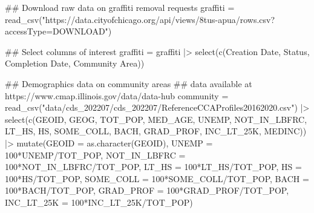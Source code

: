 \documentclass[
]{report}
\newenvironment{Shaded}{}{}
\newcommand{\AttributeTok}[1]{\textcolor[rgb]{0.84,0.23,0.29}{#1}}
\newcommand{\DecValTok}[1]{\textcolor[rgb]{0.00,0.36,0.77}{#1}}
\newcommand{\DocumentationTok}[1]{\textcolor[rgb]{0.42,0.45,0.49}{#1}}
\newcommand{\FunctionTok}[1]{\textcolor[rgb]{0.44,0.26,0.76}{#1}}
\newcommand{\NormalTok}[1]{\textcolor[rgb]{0.14,0.16,0.18}{#1}}
\newcommand{\OtherTok}[1]{\textcolor[rgb]{0.44,0.26,0.76}{#1}}
\newcommand{\SpecialCharTok}[1]{\textcolor[rgb]{0.00,0.36,0.77}{#1}}
\newcommand{\StringTok}[1]{\textcolor[rgb]{0.01,0.18,0.38}{#1}}
\begin{document}
\begin{Shaded}
\begin{Highlighting}[]
\DocumentationTok{\#\# Download raw data on graffiti removal requests}
\NormalTok{graffiti }\OtherTok{=} \FunctionTok{read\_csv}\NormalTok{(}\StringTok{"https://data.cityofchicago.org/api/views/8tus{-}apua/rows.csv?accessType=DOWNLOAD"}\NormalTok{)}

\DocumentationTok{\#\# Select columns of interest}
\NormalTok{graffiti }\OtherTok{=}\NormalTok{ graffiti }\SpecialCharTok{|\textgreater{}} 
  \FunctionTok{select}\NormalTok{(}\FunctionTok{c}\NormalTok{(}\StringTok{\textasciigrave{}}\AttributeTok{Creation Date}\StringTok{\textasciigrave{}}\NormalTok{, Status, }\StringTok{\textasciigrave{}}\AttributeTok{Completion Date}\StringTok{\textasciigrave{}}\NormalTok{, }\StringTok{\textasciigrave{}}\AttributeTok{Community Area}\StringTok{\textasciigrave{}}\NormalTok{))}

\DocumentationTok{\#\# Demographics data on community areas}
\DocumentationTok{\#\# data available at https://www.cmap.illinois.gov/data/data{-}hub}
\NormalTok{community }\OtherTok{=} \FunctionTok{read\_csv}\NormalTok{(}\StringTok{"data/cds\_202207/cds\_202207/ReferenceCCAProfiles20162020.csv"}\NormalTok{) }\SpecialCharTok{|\textgreater{}} 
  \FunctionTok{select}\NormalTok{(}\FunctionTok{c}\NormalTok{(GEOID, GEOG, TOT\_POP, MED\_AGE, UNEMP, NOT\_IN\_LBFRC, }
\NormalTok{           LT\_HS, HS, SOME\_COLL, BACH, GRAD\_PROF,}
\NormalTok{           INC\_LT\_25K, MEDINC)) }\SpecialCharTok{|\textgreater{}} 
  \FunctionTok{mutate}\NormalTok{(}\AttributeTok{GEOID =} \FunctionTok{as.character}\NormalTok{(GEOID),}
         \AttributeTok{UNEMP =} \DecValTok{100}\SpecialCharTok{*}\NormalTok{UNEMP}\SpecialCharTok{/}\NormalTok{TOT\_POP,}
         \AttributeTok{NOT\_IN\_LBFRC =} \DecValTok{100}\SpecialCharTok{*}\NormalTok{NOT\_IN\_LBFRC}\SpecialCharTok{/}\NormalTok{TOT\_POP,}
         \AttributeTok{LT\_HS =} \DecValTok{100}\SpecialCharTok{*}\NormalTok{LT\_HS}\SpecialCharTok{/}\NormalTok{TOT\_POP,}
         \AttributeTok{HS =} \DecValTok{100}\SpecialCharTok{*}\NormalTok{HS}\SpecialCharTok{/}\NormalTok{TOT\_POP,}
         \AttributeTok{SOME\_COLL =} \DecValTok{100}\SpecialCharTok{*}\NormalTok{SOME\_COLL}\SpecialCharTok{/}\NormalTok{TOT\_POP,}
         \AttributeTok{BACH =} \DecValTok{100}\SpecialCharTok{*}\NormalTok{BACH}\SpecialCharTok{/}\NormalTok{TOT\_POP,}
         \AttributeTok{GRAD\_PROF =} \DecValTok{100}\SpecialCharTok{*}\NormalTok{GRAD\_PROF}\SpecialCharTok{/}\NormalTok{TOT\_POP,}
         \AttributeTok{INC\_LT\_25K =} \DecValTok{100}\SpecialCharTok{*}\NormalTok{INC\_LT\_25K}\SpecialCharTok{/}\NormalTok{TOT\_POP)}


\end{Highlighting}
\end{Shaded}
\end{document}
